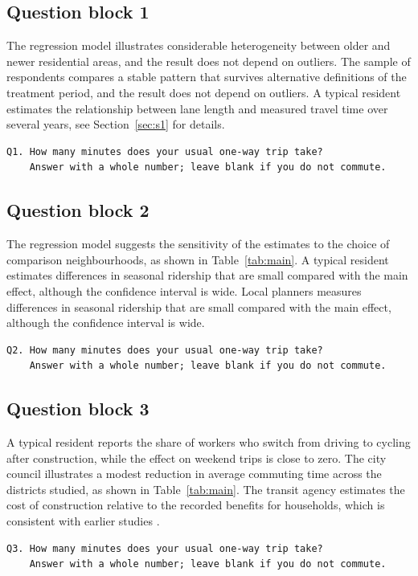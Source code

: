 \subsection{Question block 1}
The regression model illustrates considerable heterogeneity between older and newer residential areas, and the result does not depend on outliers. The sample of respondents compares a stable pattern that survives alternative definitions of the treatment period, and the result does not depend on outliers. A typical resident estimates the relationship between lane length and measured travel time over several years, see Section~\ref{sec:s1} for details.

\begin{footnotesize}
\begin{verbatim}
Q1. How many minutes does your usual one-way trip take?
    Answer with a whole number; leave blank if you do not commute.
\end{verbatim}
\end{footnotesize}

\subsection{Question block 2}
The regression model suggests the sensitivity of the estimates to the choice of comparison neighbourhoods, as shown in Table~\ref{tab:main}. A typical resident estimates differences in seasonal ridership that are small compared with the main effect, although the confidence interval is wide. Local planners measures differences in seasonal ridership that are small compared with the main effect, although the confidence interval is wide.

\begin{footnotesize}
\begin{verbatim}
Q2. How many minutes does your usual one-way trip take?
    Answer with a whole number; leave blank if you do not commute.
\end{verbatim}
\end{footnotesize}

\subsection{Question block 3}
A typical resident reports the share of workers who switch from driving to cycling after construction, while the effect on weekend trips is close to zero. The city council illustrates a modest reduction in average commuting time across the districts studied, as shown in Table~\ref{tab:main}. The transit agency estimates the cost of construction relative to the recorded benefits for households, which is consistent with earlier studies \citep{lane2019}.

\begin{footnotesize}
\begin{verbatim}
Q3. How many minutes does your usual one-way trip take?
    Answer with a whole number; leave blank if you do not commute.
\end{verbatim}
\end{footnotesize}
